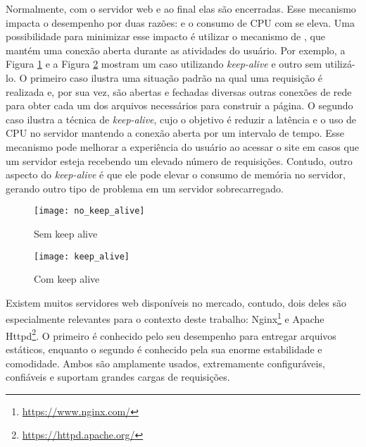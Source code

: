 Normalmente,  com o
servidor web e ao final elas são encerradas. Esse mecanismo impacta o
desempenho por duas razões:  e o consumo de CPU com  se eleva. Uma possibilidade para minimizar esse impacto é utilizar
o mecanismo de , que mantém uma conexão
aberta durante as atividades do usuário. Por exemplo, a Figura
\ref{fig:no_keep_alive} e a Figura \ref{fig:keep_alive} mostram um caso
utilizando \textit{keep-alive} e outro sem utilizá-lo. O primeiro caso ilustra
uma situação padrão na qual uma requisição é realizada e, por sua vez, são abertas
e fechadas diversas outras conexões de rede para obter cada um dos arquivos necessários para
construir a página. O segundo caso ilustra a técnica de
\textit{keep-alive}, cujo o objetivo é reduzir a latência e o uso de CPU no
servidor mantendo a conexão aberta por um intervalo de tempo.  Esse mecanismo
pode melhorar a experiência do usuário ao acessar o site em casos que um
servidor esteja recebendo um elevado número de requisições. Contudo, outro
aspecto do \textit{keep-alive} é que ele pode elevar o consumo de memória no servidor,
gerando outro tipo de problema em um servidor sobrecarregado.


\begin{figure}[!h]
  \centering
  \texttt{[image: no\_keep\_alive]}
  \caption{Sem keep alive}
  \label{fig:no_keep_alive}
\end{figure}

\begin{figure}[!h]
  \texttt{[image: keep\_alive]}
  \caption{Com keep alive}
  \label{fig:keep_alive}
\end{figure}

Existem muitos servidores web disponíveis no mercado, contudo, dois deles são
especialmente relevantes para o contexto deste trabalho:
Nginx\footnote{\url{https://www.nginx.com/}} e Apache
Httpd\footnote{\url{https://httpd.apache.org/}}.  O primeiro é conhecido pelo
seu desempenho para entregar arquivos estáticos, enquanto o segundo é conhecido
pela sua enorme estabilidade e comodidade. Ambos são amplamente usados, extremamente
configuráveis, confiáveis e suportam grandes cargas de requisições.

